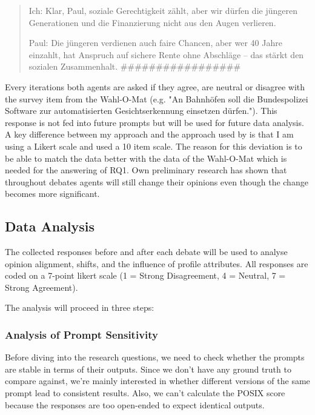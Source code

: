 \documentclass[12pt]{article}
\begin{document}
\begin{multicols}{2}
\begin{quote}
Ich: Klar, Paul, soziale Gerechtigkeit zählt, aber wir dürfen die jüngeren Generationen und die Finanzierung nicht aus den Augen verlieren.

Paul: Die jüngeren verdienen auch faire Chancen, aber wer 40 Jahre einzahlt, hat Anspruch auf sichere Rente ohne Abschläge – das stärkt den sozialen Zusammenhalt.
\#\#\#\#\#\#\#\#\#\#\#\#\#\#\#\#\#
\end{quote}



Every iterations both agents are asked if they agree, are neutral or disagree with the survey item from the Wahl-O-Mat (e.g. "An Bahnhöfen soll die Bundespolizei Software zur automatisierten Gesichtserkennung einsetzen dürfen."). This response is not fed into future prompts but will be used for future data analysis. A key difference between my approach and the approach used by  is that I am using a Likert scale and  used a 10 item scale. The reason for this deviation is to be able to match the data better with the data of the Wahl-O-Mat which is needed for the answering of RQ1. Own preliminary research has shown that throughout debates agents will still change their opinions even though the change becomes more significant.  

\subsection{Data Analysis}

The collected responses before and after each debate will be used to analyse opinion alignment, shifts, and the influence of profile attributes. All responses are coded on a 7-point likert scale (1 = Strong Disagreement, 4 = Neutral, 7 = Strong Agreement).

The analysis will proceed in three steps:


\subsubsection{Analysis of Prompt Sensitivity}


Before diving into the research questions, we need to check whether the prompts are stable in terms of their outputs. Since we don't have any ground truth to compare against, we're mainly interested in whether different versions of the same prompt lead to consistent results. Also, we can't calculate the POSIX score \cite{chatterjee2024posix} because the responses are too open-ended to expect identical outputs.


\end{multicols}
\end{document}
